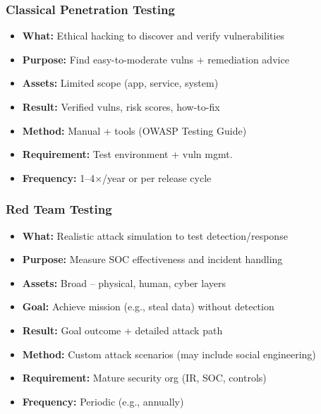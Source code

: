 \subsubsection{Classical Penetration Testing}
\begin{itemize}[noitemsep]
  \item \textbf{What:} Ethical hacking to discover and verify vulnerabilities
  \item \textbf{Purpose:} Find easy-to-moderate vulns + remediation advice
  \item \textbf{Assets:} Limited scope (app, service, system)
  \item \textbf{Result:} Verified vulns, risk scores, how-to-fix
  \item \textbf{Method:} Manual + tools (OWASP Testing Guide)
  \item \textbf{Requirement:} Test environment + vuln mgmt.
  \item \textbf{Frequency:} 1–4×/year or per release cycle
\end{itemize}

\subsubsection{Red Team Testing}
\begin{itemize}[noitemsep]
  \item \textbf{What:} Realistic attack simulation to test detection/response
  \item \textbf{Purpose:} Measure SOC effectiveness and incident handling
  \item \textbf{Assets:} Broad – physical, human, cyber layers
  \item \textbf{Goal:} Achieve mission (e.g., steal data) without detection
  \item \textbf{Result:} Goal outcome + detailed attack path
  \item \textbf{Method:} Custom attack scenarios (may include social engineering)
  \item \textbf{Requirement:} Mature security org (IR, SOC, controls)
  \item \textbf{Frequency:} Periodic (e.g., annually)
\end{itemize}

